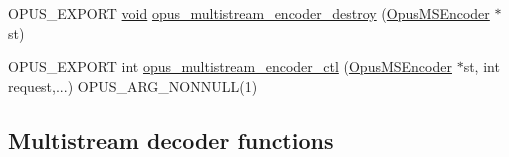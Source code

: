 \begin{DoxyCompactItemize}
\item 
O\+P\+U\+S\+\_\+\+E\+X\+P\+O\+RT \mbox{\hyperlink{_s_d_l__opengles2__gl2ext_8h_ae5d8fa23ad07c48bb609509eae494c95}{void}} \mbox{\hyperlink{group__opus__multistream_ga24b8a4ceb20a142069084cb1edd28a30}{opus\+\_\+multistream\+\_\+encoder\+\_\+destroy}} (\mbox{\hyperlink{group__opus__multistream_gae5826674d142fc873ebc1d781c507dd7}{Opus\+M\+S\+Encoder}} $\ast$st)
\item 
O\+P\+U\+S\+\_\+\+E\+X\+P\+O\+RT int \mbox{\hyperlink{group__opus__multistream_ga0f8756c84c7c62a38f99fb5cd6ed68af}{opus\+\_\+multistream\+\_\+encoder\+\_\+ctl}} (\mbox{\hyperlink{group__opus__multistream_gae5826674d142fc873ebc1d781c507dd7}{Opus\+M\+S\+Encoder}} $\ast$st, int request,...) O\+P\+U\+S\+\_\+\+A\+R\+G\+\_\+\+N\+O\+N\+N\+U\+LL(1)
\end{DoxyCompactItemize}
\subsection*{Multistream decoder functions}
